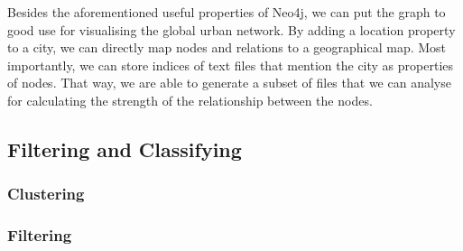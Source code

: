 Besides the aforementioned useful properties of Neo4j, we can put the graph to good use for visualising the global urban network. By adding a location property to a city, we can directly map nodes and relations to a geographical map. Most importantly, we can store indices of text files that mention the city as properties of nodes. That way, we are able to generate a subset of files that we can analyse for calculating the strength of the relationship between the nodes.

\subsection{Filtering and Classifying}

\subsubsection{Clustering}
\subsubsection{Filtering}

